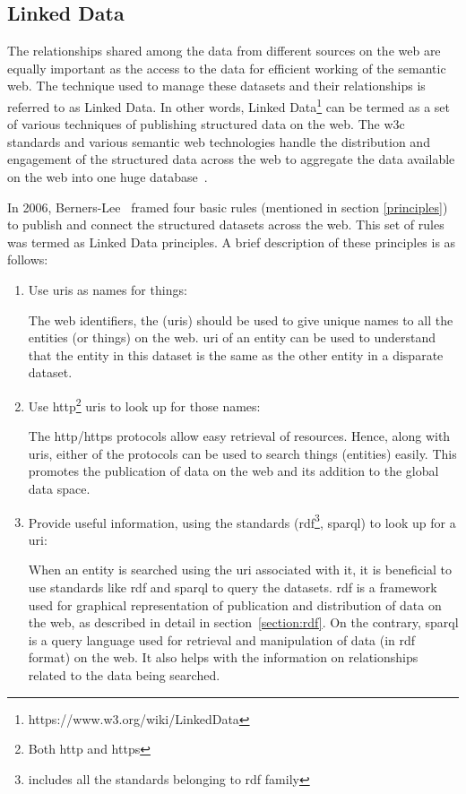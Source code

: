 \begin{doublespace}
\subsection{Linked Data}
\par The relationships shared among the data from different sources on the web are equally important as the access to the data for efficient working of the semantic web. The technique used to manage these datasets and their relationships is referred to as Linked Data. In other words, Linked Data\footnote{https://www.w3.org/wiki/LinkedData} can be termed as a set of various techniques of publishing structured data on the web. The \ac{w3c} standards and various semantic web technologies handle the distribution and engagement of the structured data across the web to aggregate the data available on the web into one huge database~\cite{bernerslee1999weaving}.
\par In 2006, Berners-Lee~\cite{bizer2009linked} framed four basic rules (mentioned in section \ref{principles}) to publish and connect the structured datasets across the web. This set of rules was termed as Linked Data principles. A brief description of these principles is as follows:
\begin{enumerate}
  \item Use \ac{uri}s as names for things:
  \par The web identifiers, the (\ac{uri}s) should be used to give unique names to all the entities (or things) on the web. \ac{uri} of an entity can be used to understand that the entity in this dataset is the same as the other entity in a disparate dataset. 
  \item Use \ac{http}\footnote{Both \ac{http} and \ac{https}} \ac{uri}s to look up for those names:
  \par The \ac{http}/\ac{https} protocols allow easy retrieval of resources. Hence, along with \ac{uri}s, either of the protocols can be used to search things (entities) easily. This promotes the publication of data on the web and its addition to the global data space.
  \item Provide useful information, using the standards (\ac{rdf}\footnote{includes all the standards belonging to \ac{rdf} family}, \ac{sparql}) to look up for a \ac{uri}:
  \par When an entity is searched using the \ac{uri} associated with it, it is beneficial to use standards like \ac{rdf} and \ac{sparql} to query the datasets. \ac{rdf} is a framework used for graphical representation of publication and distribution of data on the web, as described in detail in section~\ref{section:rdf}. On the contrary, \ac{sparql} is a query language used for retrieval and manipulation of data (in \ac{rdf} format) on the web. It also helps with the information on relationships related to the data being searched.

\end{enumerate}
\end{doublespace}
